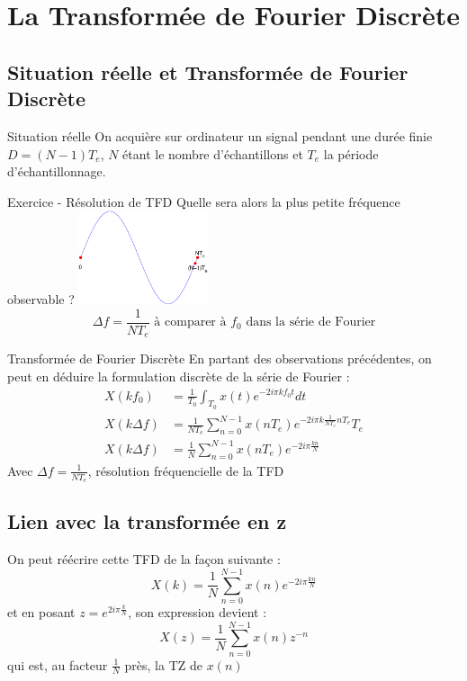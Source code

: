 \documentclass[a4paper,11pt]{beamer}
\newcounter{exampleBlockCounter}
\begin{document}
\section[La TFD]{La Transformée de Fourier Discrète}
\subsection{Situation réelle et Transformée de Fourier Discrète}
\begin{frame}
\begin{block}{Situation réelle}
\justify
On acquière sur ordinateur un signal pendant une durée
finie $D = (N-1)T_e$, $N$ étant le nombre d'échantillons et $T_e$ la période
d'échantillonnage. 
\end{block}
\begin{exampleblock}{Exercice  -
Résolution de TFD}
\center
Quelle sera alors la plus petite fréquence observable ?
\pause
\center
\includegraphics [width=1.5in]{images/Exercice_IV_01.eps}
\pause 
$$\Delta f=\frac{1}{NT_e}\text{ à comparer à }f_0\text{ dans la série de
Fourier}$$
\end{exampleblock}
\end{frame}

\begin{frame}
\begin{block}{Transformée de Fourier Discrète}
\justify
En partant des observations précédentes, on peut en
déduire la formulation discrète de la série de Fourier :
$$
\begin{aligned}
X(kf_0) &= \frac{1}{T_0}\int_{T_0} x(t) e^{-2i\pi kf_0 t}dt \\
X(k\Delta f) &= \frac{1}{NT_e}\sum_{n=0}^{N-1}x(nT_e)e^{-2i\pi k
\frac{1}{NT_e}nT_e}T_e\\
X(k\Delta f) &= \frac{1}{N}\sum_{n=0}^{N-1}x(nT_e)e^{-2i\pi
\frac{kn}{N}}
\end{aligned}
$$ 
\center
Avec $\Delta f=\frac{1}{NT_e}$, résolution fréquencielle de la TFD
\end{block}
\end{frame}

\subsection{Lien avec la transformée en z}
\begin{frame}
\justifying
On peut réécrire cette TFD de la façon suivante :
$$
X(k) = \frac{1}{N}\sum_{n=0}^{N-1}x(n)e^{-2i\pi\frac{kn}{N}}
$$
et en posant $z = e^{2i\pi\frac{k}{N}}$, son expression devient :
$$
X(z) = \frac{1}{N}\sum_{n=0}^{N-1}x(n)z^{-n}
$$
qui est, au facteur $\frac{1}{N}$ près, la TZ de $x(n)$
\end{frame}
\end{document}
